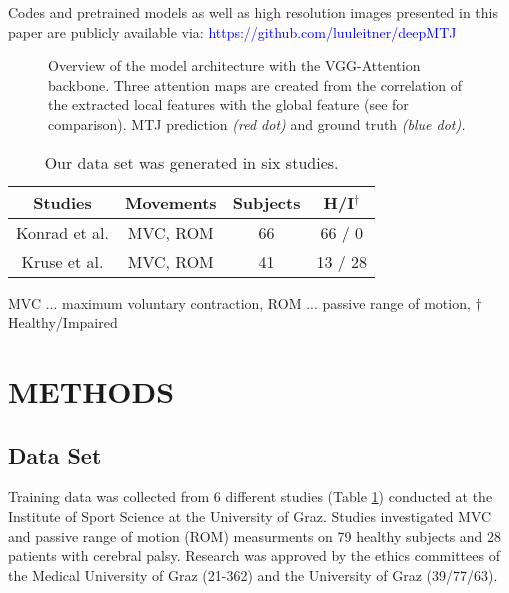 \documentclass[letterpaper, 10 pt, conference]{ieeeconf}
\begin{document}
Codes and pretrained models as well as high resolution images presented in this paper are publicly available via: \textcolor{blue}{https://github.com/luuleitner/deepMTJ}
\begin{figure*}[thpb]
  \centering
  \caption{Overview of the model architecture with the VGG-Attention backbone. Three attention maps are created from the correlation of the extracted local features with the global feature (see \cite{Attention} for comparison). MTJ prediction \textit{(red dot)} and ground truth \textit{(blue dot).}}
  \label{fig:model}
\end{figure*}
\begin{table}[h]
\caption{Our data set was generated in six studies.}
\label{tab:studies}
\begin{center}
\renewcommand{\arraystretch}{1.20}
\begin{tabular}{cccc}
\toprule
\textbf{Studies}       & \textbf{Movements} & \textbf{Subjects} & \textbf{H/I$^\dagger$} \\ 
\midrule
Konrad et al. \cite{j:Konrad2014:1,j:Konrad2015,j:Konrad2014:2} & MVC, ROM  & 66       & 66 / 0     \\
Kruse et al. \cite{j:Kruse2017,j:Kruse2018,j:Kruse2019}  & MVC, ROM  & 41       & 13 / 28            \\ 
\bottomrule
\end{tabular}
 \begin{tablenotes}
    \item MVC ... maximum voluntary contraction, ROM ... passive range of motion, $\dagger$ Healthy/Impaired 
    \end{tablenotes}
\end{center}
\end{table}
\section{METHODS} 
\label{sect:methods}
\subsection{Data Set}
Training data was collected from 6 different studies (Table \ref{tab:studies}) conducted at the Institute of Sport Science at the University of Graz. Studies investigated MVC and passive range of motion (ROM) measurments on 79 healthy subjects and 28 patients with cerebral palsy. Research was approved by the ethics committees of the Medical University of Graz (21-362) and the University of Graz (39/77/63). 
\end{document}

